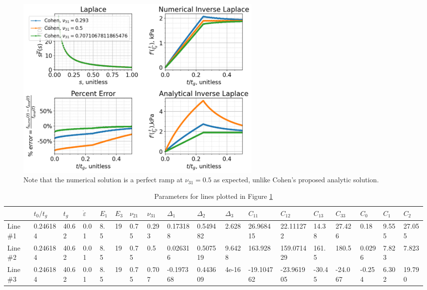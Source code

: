 \documentclass{article}
\begin{document}
\begin{figure}[!ht]
\centering
\includegraphics[width=0.6\textwidth]{PlotsWhenC1=C2.png}
\caption{\label{fig:C1EqualsC2} Note that the numerical solution is a perfect ramp at $\nu_{31}=0.5$ as expected, unlike Cohen's proposed analytic solution.}
\end{figure}

\begin{table}[!ht]
    \centering
    \caption{\label{tab:C1EqualsC2} Parameters for lines plotted in Figure \ref{fig:C1EqualsC2}}
    \begin{tabular}{|l|l|l|l|l|l|l|l|l|l|l|l|l|l|l|l|l|l|}
    \hline
    \rowcolor[HTML]{C0C0C0} 
        ~                        & $t_0/t_g$ & $t_g$ & $\dot{\varepsilon{}}$ & $E_1$ & $E_3$ & $\nu_{21}$ & $\nu_{31}$ & $\Delta_1$ & $\Delta_2$ & $\Delta_3$ & $C_{11}$   & $C_{12}$   & $C_{13}$ & $C_{33}$ & $C_0$  & $C_1$ & $C_2$  \\ \hline
\cellcolor[HTML]{EFEFEF}Line \#1 & 0.246184  & 40.62 & 0.01                  & 8.5   & 19    & 0.75       & 0.293      & 0.173188   & 0.549482   & 2.628      & 26.968415  & 22.111272  & 14.38    & 27.426   & 0.18   & 9.555 & 27.055 \\ \hline
\cellcolor[HTML]{EFEFEF}Line \#2 & 0.246184  & 40.62 & 0.01                  & 8.5   & 19    & 0.75       & 0.5        & 0.026316   & 0.507519   & 9.6428     & 163.928    & 159.071429 & 161.5    & 180.5    & 0.0296 & 7.823 & 7.823  \\ \hline
\cellcolor[HTML]{EFEFEF}Line \#3 & 0.246184  & 40.62 & 0.01                  & 8.5   & 19    & 0.75       & 0.707      & -0.197368  & 0.443609   & 4e-16      & -19.104762 & -23.961905 & -30.45   & -24.067  & -0.254 & 6.302 & 19.790 \\ \hline
    \end{tabular}
\end{table}
\end{document}
